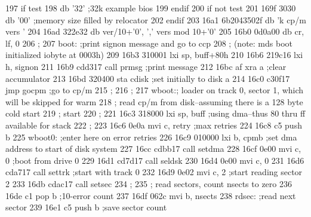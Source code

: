 197                                if       test
198                                db       '32'       ;32k example bios
199                       endif
200                                if       not test
201      169f 3030                 db       '00'       ;memory size filled by relocator
202                                endif
203      16a1 6b2043502f           db       'k cp/m vers '
204      16ad 322e32               db       ver/10+'0', ',' vers mod 10+'0'
205      16b0 0d0a00               db       cr, lf, 0
206                       ;
207                       boot:    ;print signon message and go to ccp
208                       ;        (note: mds boot initialized iobyte at 0003h)
209      16b3 310001               lxi      sp, buff+80h
210      16b6 219c16               lxi      h, signon
211      16b9 cdd317               call     prmsg      ;print message
212      16bc af                   xra      a          ;clear accumulator
213      16bd 320400               sta      cdisk      ;set initially to disk a
214      16c0 c30f17               jmp      gocpm      ;go to cp/m
215                       ;
216                       ;
217                       wboot:;  loader on track 0, sector 1, which will be skipped for warm
218                       ;        read cp/m from disk--assuming there is a 128 byte cold start
219                       ;        start
220                       ;
221      16c3 318000               lxi      sp, buff   ;using dma--thus 80 thru ff available for stack
222                       ;
223      16c6 0e0a                 mvi      c, retry   ;max retries
224      16c8 c5                   push     b
225                       wboot0:  ;enter here on error retries
226      16c9 010000               lxi      b, cpmb    ;set dma address to start of disk system
227      16cc cdbb17               call     setdma
228      16cf 0e00                 mvi      c, 0       ;boot from drive 0
229      16d1 cd7d17               call     seldsk
230      16d4 0e00                 mvi      c, 0
231      16d6 cda717               call     settrk     ;start with track 0
232      16d9 0e02                 mvi      c, 2       ;start reading sector 2
233      16db cdac17               call     setsec
234                       ;
235                       ;        read sectors, count nsects to zero
236      16de c1                   pop      b          ;10-error count
237      16df 062c                 mvi      b, nsects
238                       rdsec:   ;read next sector
239      16e1 c5                   push     b          ;save sector count
